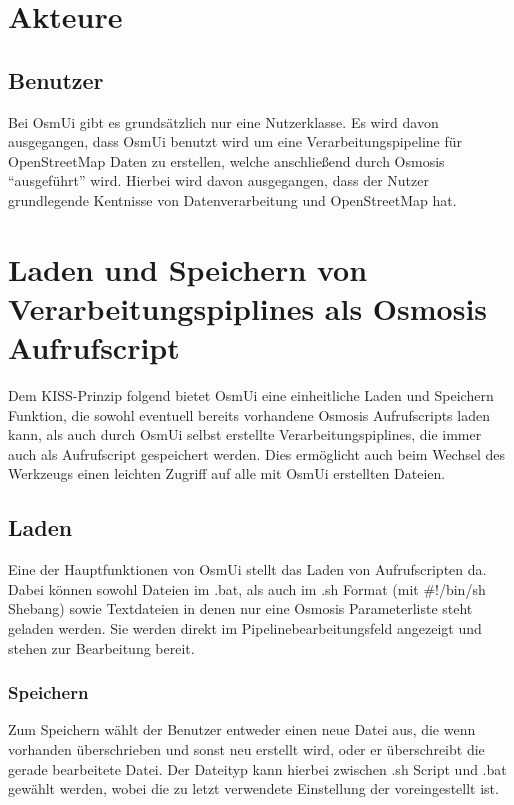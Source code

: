 \documentclass[a4paper,10pt]{scrartcl}
\begin{document}
\section{Akteure}
\subsection{Benutzer}
Bei OsmUi gibt es grundsätzlich nur eine Nutzerklasse. Es wird davon ausgegangen, dass OsmUi benutzt wird um eine Verarbeitungspipeline für OpenStreetMap Daten
zu erstellen, welche anschließend durch Osmosis ``ausgeführt'' wird. Hierbei wird davon ausgegangen, dass der Nutzer grundlegende Kentnisse 
von Datenverarbeitung und OpenStreetMap hat.
\section{Laden und Speichern von Verarbeitungspiplines als Osmosis Aufrufscript}
Dem KISS-Prinzip folgend bietet OsmUi eine einheitliche Laden und Speichern Funktion, die sowohl eventuell bereits vorhandene Osmosis Aufrufscripts
laden kann, als auch durch OsmUi selbst erstellte Verarbeitungspiplines, die immer auch als Aufrufscript gespeichert werden. 
Dies ermöglicht auch beim Wechsel des Werkzeugs einen leichten Zugriff auf alle mit OsmUi erstellten Dateien.
\subsection{Laden}
Eine der Hauptfunktionen von OsmUi stellt das Laden von Aufrufscripten da. Dabei können sowohl Dateien im .bat, als auch im .sh Format (mit \#!/bin/sh Shebang)
sowie Textdateien in denen nur eine Osmosis Parameterliste steht geladen werden. Sie werden direkt im Pipelinebearbeitungsfeld angezeigt und
stehen zur Bearbeitung bereit.
\subsubsection{Speichern}
Zum Speichern wählt der Benutzer entweder einen neue Datei aus, die wenn vorhanden überschrieben und sonst neu erstellt wird, oder er überschreibt die gerade bearbeitete Datei.
Der Dateityp kann hierbei zwischen .sh Script und .bat gewählt werden, wobei die zu letzt verwendete Einstellung der voreingestellt ist.
\end{document}
